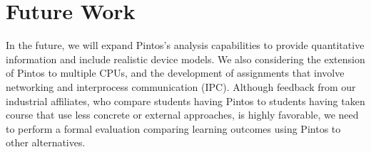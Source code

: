 \section{Future Work}

In the future, we will expand Pintos's analysis capabilities to
provide quantitative information  and include realistic
device models.
We also considering the extension of Pintos to multiple
CPUs, and the development of assignments that involve
networking and interprocess communication (IPC).
Although feedback from our industrial affiliates, who compare
students having Pintos to students having taken course that use
less concrete or external approaches, is highly favorable,
we need to perform a formal evaluation comparing learning 
outcomes using Pintos to other alternatives.
